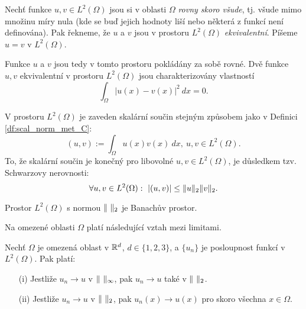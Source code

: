 \begin{df}
Nechť funkce $u,v\in L^2(\Omega)$ jsou si v oblasti $\Omega$ \emph{rovny skoro všude}, tj. všude mimo množinu míry nula (kde se buď jejich hodnoty liší nebo některá z funkcí není definována).
Pak řekneme, že $u$ a $v$ jsou v prostoru $L^2(\Omega)$ \emph{ekvivalentní}.
Píšeme $u=v$ v $L^2(\Omega)$.
\end{df}
Funkce $u$ a $v$ jsou tedy v tomto prostoru pokládány za sobě rovné.
Dvě funkce $u,v$ ekvivalentní v prostoru $L^2(\Omega)$ jsou charakterizovány vlastností
\[ \int_\Omega|u(x)-v(x)|^2~dx = 0. \]

V prostoru $L^2(\Omega)$ je zaveden skalární součin stejným způsobem jako v Definici \ref{df:scal_norm_met_C}:
\[ (u,v) := \int_\Omega u(x)v(x)~dx,~u,v\in L^2(\Omega). \]
To, že skalární součin je konečný pro libovolné $u,v\in L^2(\Omega)$, je důsledkem tzv. Schwarzovy nerovnosti:
\[ \forall u,v\in L^2(\Omega):~|(u,v)| \le \|u\|_{2} \|v\|_{2}. \]

\begin{veta}
Prostor $L^2(\Omega)$ s normou $\|\ \|_2$ je Banachův prostor.
\end{veta}

Na omezené oblasti $\Omega$ platí následující vztah mezi limitami.
\begin{veta}
Nechť $\Omega$ je omezená oblast v $\mathbb R^d$, $d\in\{1,2,3\}$, a $\{u_n\}$ je posloupnost funkcí v $L^2(\Omega)$.
Pak platí:
\begin{itemize}
\item[(i)] Jestliže $u_n\to u$ v $\|\ \|_\infty$, pak $u_n\to u$ také v $\|\ \|_2$.
\item[(ii)] Jestliže $u_n\to u$ v $\|\ \|_2$, pak $u_n(x)\to u(x)$ pro skoro všechna $x\in\Omega$.
\end{itemize}
\end{veta}






